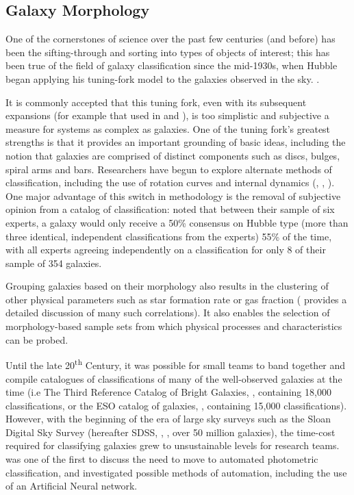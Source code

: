 \documentclass[../main.tex]{subfiles}
\begin{document}
\subsection{Galaxy Morphology}
\label{subsec:galaxy-morphology}
One of the cornerstones of science over the past few centuries (and before) has been the sifting-through and sorting into types of objects of interest; this has been true of the field of galaxy classification since the mid-1930s, when Hubble began applying his tuning-fork model to the galaxies observed in the sky. \citep{Hubble1936}.

It is commonly accepted that this tuning fork, even with its subsequent expansions (for example that used in \citealt{Sandage1961} and \citealt{deVaucouleurs1991}), is too simplistic and subjective a measure for systems as complex as galaxies. One of the tuning fork's greatest strengths is that it provides an important grounding of basic ideas, including the notion that galaxies are comprised of distinct components such as discs, bulges, spiral arms and bars. Researchers have begun to explore alternate methods of classification, including the use of rotation curves and internal dynamics (\citealt{2011MNRAS.413..813C}, \citealt{2017MNRAS.469.2539K}, \citealt{Fall2018:1812.06144v1}). One major advantage of this switch in methodology is the removal of subjective opinion from a catalog of classification: \citet{Naim1995:astro-ph/9502078v1} noted that between their sample of six experts, a galaxy would only receive a 50\% consensus on Hubble type (more than three identical, independent classifications from the experts) 55\% of the time, with all experts agreeing independently on a classification for only 8 of their sample of 354 galaxies.

Grouping galaxies based on their morphology also results in the clustering of other physical parameters such as star formation rate or gas fraction (\citealt{RobertsHaynes1994} provides a detailed discussion of many such correlations). It also enables the selection of morphology-based sample sets from which physical processes and characteristics can be probed. 

Until the late 20\textsuperscript{th} Century, it was possible for small teams to band together and compile catalogues of classifications of many of the well-observed galaxies at the time (i.e The Third Reference Catalog of Bright Galaxies, \citealt{deVaucouleurs1991}, containing 18,000 classifications, or the ESO catalog of galaxies, \citealt{1989Msngr..56...31L}, containing 15,000 classifications). However, with the beginning of the era of large sky surveys such as the Sloan Digital Sky Survey (hereafter SDSS, \citealt{2017AJ....154...28B}, \citealt{SDSSDR7}, over 50 million galaxies), the time-cost required for classifying galaxies grew to unsustainable levels for research teams. \citet{Naim1995:astro-ph/9502078v1} was one of the first to discuss the need to move to automated photometric classification, and investigated possible methods of automation, including the use of an Artificial Neural network.
\end{document}
